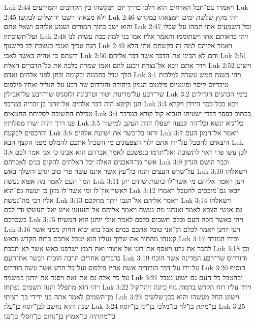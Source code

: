 Luk 2:44  ויאמרו עם־חבל הארחים הוא וילכו כדרך יום ויבקשהו בין הקרובים והמידעים׃
Luk 2:45  ולא מצאהו וישבו ירושלים לבקשו׃
Luk 2:46  ויהי מקץ שלשת ימים וימצאהו במקדש והוא ישב בתוך המורים ושמע אליהם ושאל אתם׃
Luk 2:47  וכל־השמעים אתו תמהו על־שכלו ועל־תשובתיו׃
Luk 2:48  ויהי כראותם אתו וישתוממו ותאמר אליו אמו בני למה ככה עשית לנו הנה אביך ואנכי בעצבת־לב בקשנוך׃
Luk 2:49  ויאמר אליהם למה זה בקשתם אתי הלא ידעתם כי אהיה באשר לאבי׃
Luk 2:50  והם לא הבינו את־הדבר אשר דבר אליהם׃
Luk 2:51  וירד אתם ויבא אל־נצרת ויכנע להם ואמו שמרה בלבה את כל־הדברים האלה׃
Luk 2:52  וישוע הלך וגדל בחכמה ובקומה ובחן לפני אלהים ואדם׃
Luk 3:1  ויהי בשנת חמש עשרה למלכות טיבריוס קיסר ופונטיוס פילטוס הגמון ביהודה והורדוס שר־רבע על־הגליל ואחיו פילפוס שר־רבע על־מדינות יטור וטרכונה ולוסניס שר־רבע על־אבילין׃
Luk 3:2  בימי הכהנים הגדולים חנן וקיפא היה דבר אלהים אל־יוחנן בן־זכריה במדבר׃
Luk 3:3  ויבא בכל־ככר הירדן ויקרא טבילת התשובה לסליחת החטאים׃
Luk 3:4  ככתוב בספר דברי ישעיהו הנביא קול קורא במדבר פנו דרך יהוה ישרו מסלותיו׃
Luk 3:5  כל־גיא ינשא וכל־הר וגבעה ישפלו והיה העקב למישור והרכסים לבקעה׃
Luk 3:6  וראו כל־בשר את ישועת אלהים׃
Luk 3:7  ויאמר אל־המון העם היצאים להטבל על־ידו אתם ילדי הצפעונים מי השכיל אתכם להמלט מפני הקצף הבא׃
Luk 3:8  לכן עשו פרי ראוי לתשובה ואל־תדמו בנפשכם לאמר אברהם הוא אבינו כי אני אמר לכם אשר מן־האבנים האלה יכל האלהים להקים בנים לאברהם׃
Luk 3:9  וכבר הושם הגרזן על־שרש העצים והנה כל־עץ אשר איננו עשה פרי טוב יגדע והשלך באש׃
Luk 3:10  וישאלהו המון העם לאמר מה אפוא נעשה׃
Luk 3:11  ויען ויאמר אליהם מי אשר־לו כתנות שתים יתן לאשר אין־לו ומי אשר־לו מזון כן יעשה גם־הוא׃
Luk 3:12  ויבאו גם־מוכסים להטבל ויאמרו אליו רבי מה־נעשה׃
Luk 3:13  ויאמר אליהם אל־תגבו יותר מחקכם׃
Luk 3:14  וישאלהו גם־אנשי הצבא לאמר ואנחנו מה־נעשה ויאמר אליהם אל־תזעזעו איש ואל־תעשקו ודי לכם בשכרכם׃
Luk 3:15  ויהי כאשר־חכה העם וכלם חשבים בלבם לאמר אולי יוחנן הוא המשיח׃
Luk 3:16  ויען יוחנן ויאמר לכלם הן־אני טובל אתכם במים אבל בוא יבוא החזק ממני אשר קטנתי מהתיר את־שרוך נעליו הוא יטבל אתכם ברוח הקדש ובאש׃
Luk 3:17  ובידו המזרה להבר את־גרנו ויאסף את־דגנו אל־אוצרו ואת־המץ ישרפנו באש אשר לא־תכבה׃
Luk 3:18  וכן בדברים אחרים הרבה הוכיח ויבשר את־העם׃
Luk 3:19  והורדוס שר־רבע המדינה אשר הוכח על־ידו על־דבר הורודיה אשת אחיו פילפוס ועל־כל־הרע אשר עשה הורדוס׃
Luk 3:20  הוסיף על־כל־אלה גם את־זאת ויסגר את־יוחנן במשמר׃
Luk 3:21  ובהטבל כל־העם גם־ישוע נטבל ויהי הוא מתפלל והנה השמים נפתחו׃
Luk 3:22  וירד עליו רוח הקדש בדמות גוף כיונה ויהי־קול מן־השמים לאמר אתה בני ידידי בך רציתי׃
Luk 3:23  וישוע החל מעשהו והוא כבן־שלשים שנה והוא נחשב לבן־יוסף בן־עלי׃
Luk 3:24  בן־מתת בן־לוי בן־מלכי בן־יני בן־יוסף׃
Luk 3:25  בן־מתתיה בן־אמוץ בן־נחום בן־חסלי בן־נגי׃
